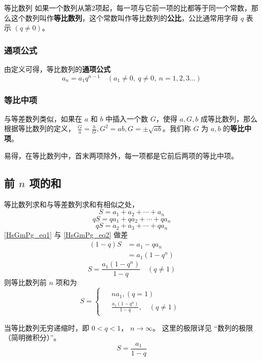 

\begin{definition}{等比数列}
如果一个数列从第2项起，每一项与它前一项的比都等于同一个常数，那么这个数列叫作\textbf{等比数列}，这个常数叫作等比数列的\textbf{公比}，公比通常用字母 $q$ 表示 $(q\ne 0)$。
\end{definition}

\subsubsection{通项公式}
由定义可得，等比数列的\textbf{通项公式}
\begin{equation}
a_n = a_1 q^{n-1} \quad (a_1 \ne 0,\ q\ne 0,\ n=1,2,3\dots)
\end{equation}

\subsubsection{等比中项}
与等差数列类似，如果在 $a$ 和 $b$ 中插入一个数 $G$，使得 $a,G,b$ 成等比数列，那么根据等比数列的定义， $\frac{G}{a} = \frac{b}{G},G^2 = ab,G = \pm \sqrt{ab}$。我们称 $G$ 为 $a,b$ 的\textbf{等比中项}。

易得，在等比数列中，首末两项除外，每一项都是它前后两项的等比中项。

\subsection{前 $n$ 项的和}
等比数列求和与等差数列求和有相似之处，
\begin{equation}\label{HsGmPg_eq1}
S = a_1 + a_2 + \cdots + a_n
\end{equation}
\begin{equation}
qS = qa_1 + qa_2 + \cdots + qa_n
\end{equation}
\begin{equation}\label{HsGmPg_eq2}
qS= a_2 + a_3 + \cdots + qa_n
\end{equation}
\autoref{HsGmPg_eq1} 与 \autoref{HsGmPg_eq2} 做差
\begin{equation}
\begin{aligned}
(1 - q)S &= a_1 - qa_n\\
&= a_1(1 - q^n)
\end{aligned}
\end{equation}
\begin{equation}
S = \frac{a_1(1-q^n)}{1-q} \quad (q\neq 1)
\end{equation}
则等比数列前 $n$ 项和为
\begin{equation}
S = 
\begin{cases}
\begin{aligned}
&na_1,(q = 1) \\
&\frac{a_1(1-q^n)}{1-q},\quad (q \neq 1)
\end{aligned}
\end{cases}
\end{equation}

当等比数列无穷递缩时，即 $0<q<1$， $n\rightarrow \infty$。 这里的极限详见 “数列的极限（简明微积分）”。
\begin{equation}
S = \frac{a_1}{1 - q}
\end{equation}
